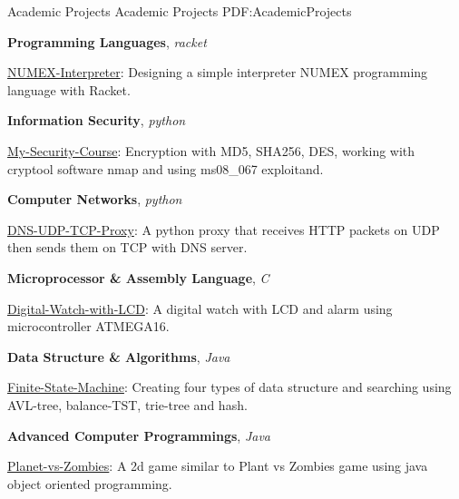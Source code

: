 \documentclass[letterpaper,MMMyyyy,nonstopmode]{simpleresumecv}
\begin{document}
\begin{Body}
\begin{multicols}{2}
\begin{itemize}[leftmargin=*]
\end{itemize}
\end{multicols}


\Section
{Academic Projects}
{Academic Projects}
{PDF:AcademicProjects}

\begin{multicols}{2}
\begin{itemize}[leftmargin=*]
\BulletItem
\textbf{Programming Languages},
\textit{\small{racket}}
\begin{Detail}
\Item
\href{https://github.com/aliyazdi75/NUMEX-Interpreter}
{NUMEX-Interpreter}:
Designing a simple interpreter
NUMEX programming language with Racket.
\end{Detail}

\BulletItem
\textbf{Information Security},
\textit{\small{python}}
\begin{Detail}
\Item
\href{https://github.com/aliyazdi75/My-Security-Course}
{My-Security-Course}:
Encryption with MD5, SHA256, DES,
working with cryptool software nmap
and using ms08\_067 exploitand.
\end{Detail}

\BulletItem
\textbf{Computer Networks},
\textit{\small{python}}
\begin{Detail}
\Item
\href{https://github.com/aliyazdi75/DNS-UDP-TCP-Proxy}
{DNS-UDP-TCP-Proxy}:
A python proxy that receives HTTP packets on UDP
then sends them on TCP with DNS server.
\end{Detail}

\columnbreak

\BulletItem
\textbf{Microprocessor \& Assembly Language},
\textit{\small{C}}
\begin{Detail}
\Item
\href{https://github.com/aliyazdi75/Digital-Watch-with-LCD}
{Digital-Watch-with-LCD}:
A digital watch with LCD and
alarm using microcontroller ATMEGA16.
\end{Detail}

\BulletItem
\textbf{Data Structure \& Algorithms},
\textit{\small{Java}}
\begin{Detail}
\Item
\href{https://github.com/aliyazdi75/Finite-State-Machine}
{Finite-State-Machine}:
Creating four types of data structure and searching using
AVL-tree, balance-TST, trie-tree and hash.
\end{Detail}

\BulletItem
\textbf{Advanced Computer Programmings},
\textit{\small{Java}}
\begin{Detail}
\Item
\href{https://github.com/aliyazdi75/Planet\_vs\_Zombies}
{Planet-vs-Zombies}:
A 2d game similar to Plant vs Zombies game
using java object oriented programming.
\end{Detail}


\end{itemize}
\end{multicols}
\end{Body}
\end{document}
